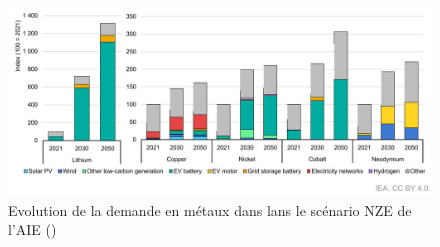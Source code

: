 \begin{figure}[!b]
    \centering
    \includegraphics[width=\textwidth]{Images/supply_chain/metals_demand.jpg}
    \caption{Evolution de la demande en métaux dans lans le scénario NZE de l'AIE (\cite{iea_energy_2023})}
    \label{fig:metals_demand}
\end{figure}


